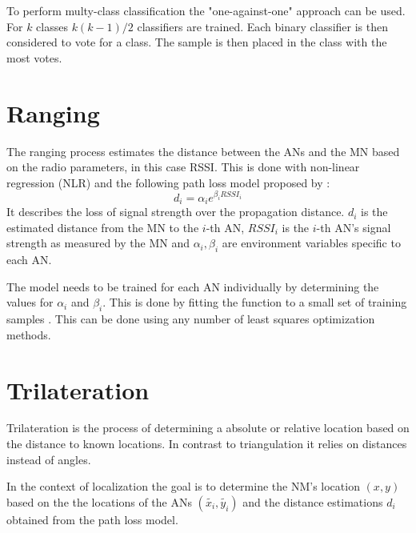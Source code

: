 To perform multy-class classification the "one-against-one" approach can be used. For \(k\) classes \(k\left ( k-1 \right )/2\) classifiers are trained. Each binary classifier is then considered to vote for a class. The sample is then placed in the class with the most votes\cite{chang2011libsvm}.


\section{Ranging}
\label{Ranging}

The ranging process estimates the distance between the ANs and the MN based on the radio parameters, in this case RSSI. This is done with non-linear regression (NLR) and the following path loss model proposed by \cite{li2015passiveWIFIsource}:
\begin{equation} \label{eqn:non-linear path loss model}
d_{i}=\alpha_{i}e^{\beta_{i}RSSI_{i}}
\end{equation}
It describes the loss of signal strength over the propagation distance. \(d_{i}\) is the estimated distance from the MN to the \(i\)-th AN, \(RSSI_{i}\) is the \(i\)-th AN's signal strength as measured by the MN and \(\alpha_{i}, \beta_{i}\) are environment variables specific to each AN.

The model needs to be trained for each AN individually by determining the values for \(\alpha_{i}\) and \(\beta_{i}\). This is done by fitting the function to a small set of training samples . This can be done using any number of least squares optimization methods.

\section{Trilateration}

Trilateration is the process of determining a absolute or relative location based on the distance to known locations. In contrast to triangulation it relies on distances instead of angles.

In the context of localization the goal is to determine the NM's location \(\left ( x,y \right )\) based on the the locations of the ANs \(\left ( \tilde{x_{i}},\tilde{y_{i}} \right )\) and the distance estimations \(d_{i}\) obtained from the path loss model.

